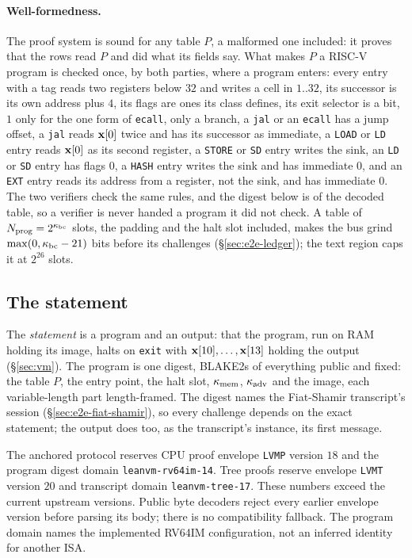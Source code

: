 \paragraph{Well-formedness.} The proof system is sound for any table $P$, a malformed one included: it proves that the rows read $P$ and did what its fields say. What makes $P$ a RISC-V program is checked once, by both parties, where a program enters: every entry with a tag reads two registers below $32$ and writes a cell in $1..32$, its successor is its own address plus $4$, its flags are ones its class defines, its exit selector is a bit, $1$ only for the one form of \texttt{ecall}, only a branch, a \texttt{jal} or an \texttt{ecall} has a jump offset, a \texttt{jal} reads $\mathbf{x}[0]$ twice and has its successor as immediate, a \texttt{LOAD} or \texttt{LD} entry reads $\mathbf{x}[0]$ as its second register, a \texttt{STORE} or \texttt{SD} entry writes the sink, an \texttt{LD} or \texttt{SD} entry has flags $0$, a \texttt{HASH} entry writes the sink and has immediate $0$, and an \texttt{EXT} entry reads its address from a register, not the sink, and has immediate $0$. The two verifiers check the same rules, and the digest below is of the decoded table, so a verifier is never handed a program it did not check. A table of $N_{\mathrm{prog}}=2^{\kappa_{\mathrm{bc}}}$ slots, the padding and the halt slot included, makes the bus grind $\max(0,\kappa_{\mathrm{bc}}-21)$ bits before its challenges (\S\ref{sec:e2e-ledger}); the text region caps it at $2^{26}$ slots.

\subsection{The statement}\label{sec:e2e-pi}

The \emph{statement} is a program and an output: that the program, run on RAM holding its image, halts on \texttt{exit} with $\mathbf{x}[10],\dots,\mathbf{x}[13]$ holding the output (\S\ref{sec:vm}). The program is one digest, BLAKE2s of everything public and fixed: the table $P$, the entry point, the halt slot, $\kappa_{\mathrm{mem}}$, $\kappa_{\mathrm{adv}}$ and the image, each variable-length part length-framed. The digest names the Fiat-Shamir transcript's session (\S\ref{sec:e2e-fiat-shamir}), so every challenge depends on the exact statement; the output does too, as the transcript's instance, its first message.

The anchored protocol reserves CPU proof envelope \texttt{LVMP} version $18$ and the program digest domain \texttt{leanvm-rv64im-14}. Tree proofs reserve envelope \texttt{LVMT} version $20$ and transcript domain \texttt{leanvm-tree-17}. These numbers exceed the current upstream versions. Public byte decoders reject every earlier envelope version before parsing its body; there is no compatibility fallback. The program domain names the implemented RV64IM configuration, not an inferred identity for another ISA.

